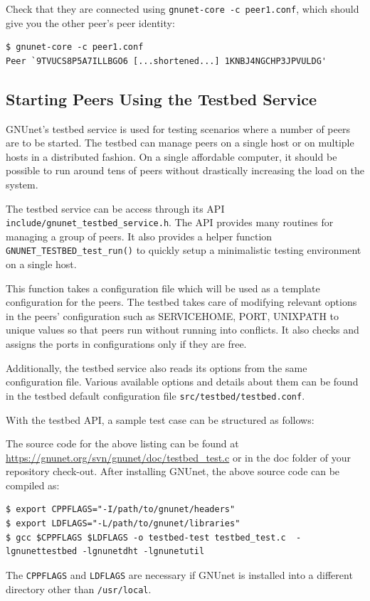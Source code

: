\documentclass[10pt]{article}
\begin{document}
Check that they are connected using {\tt gnunet-core -c peer1.conf}, which should give you the other peer's
peer identity:
\begin{lstlisting}
$ gnunet-core -c peer1.conf
Peer `9TVUCS8P5A7ILLBGO6 [...shortened...] 1KNBJ4NGCHP3JPVULDG'
\end{lstlisting}

\subsection{Starting Peers Using the Testbed Service}

GNUnet's testbed service is used for testing scenarios where a number of peers
are to be started.  The testbed can manage peers on a single host or on multiple
hosts in a distributed fashion.  On a single affordable computer, it should be
possible to run around tens of peers without drastically increasing the load on the
system.

The testbed service can be access through its API
\texttt{include/gnunet\_testbed\_service.h}.  The API provides many routines for
managing a group of peers.  It also provides a helper function
\texttt{GNUNET\_TESTBED\_test\_run()} to quickly setup a minimalistic testing
environment on a single host.

This function takes a configuration file which will be used as a template
configuration for the peers.  The testbed takes care of modifying relevant
options in the peers' configuration such as SERVICEHOME, PORT, UNIXPATH to
unique values so that peers run without running into conflicts.  It also checks
and assigns the ports in configurations only if they are free.

Additionally, the testbed service also reads its options from the same
configuration file.  Various available options and details about them can be
found in the testbed default configuration file \texttt{src/testbed/testbed.conf}.

With the testbed API, a sample test case can be structured as follows:

The source code for the above listing can be found at
\url{https://gnunet.org/svn/gnunet/doc/testbed_test.c}
or in the doc folder of your repository check-out.
After installing GNUnet, the above source code can be compiled as:
\lstset{language=bash}
\begin{lstlisting}
$ export CPPFLAGS="-I/path/to/gnunet/headers"
$ export LDFLAGS="-L/path/to/gnunet/libraries"
$ gcc $CPPFLAGS $LDFLAGS -o testbed-test testbed_test.c  -lgnunettestbed -lgnunetdht -lgnunetutil
\end{lstlisting}
The \texttt{CPPFLAGS} and \texttt{LDFLAGS} are necessary if GNUnet is installed
into a different directory other than \texttt{/usr/local}.
\end{document}
